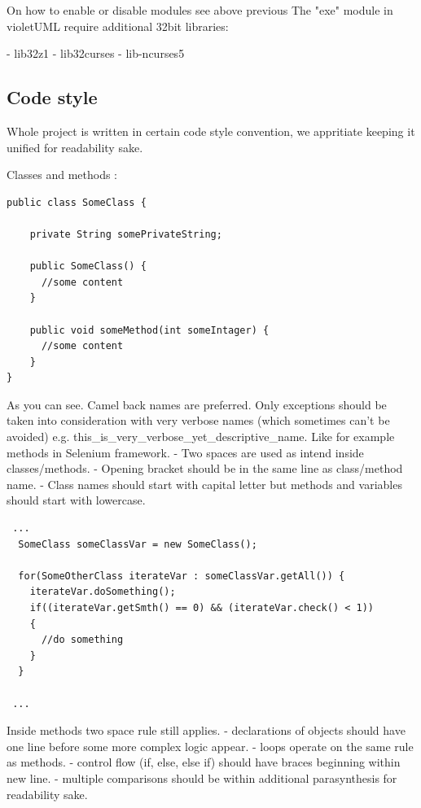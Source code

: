 \documentclass{article}
\begin{document}
On how to enable or disable modules see above previous
The "exe" module in violetUML require additional 32bit libraries:

- lib32z1\newline
- lib32curses\newline
- lib-ncurses5\newline


\subsection{Code style}

Whole project is written in certain code style convention, we appritiate keeping it unified for readability sake.

Classes and methods :
\begin{lstlisting}
public class SomeClass {

    private String somePrivateString;

    public SomeClass() {
      //some content
    }

    public void someMethod(int someIntager) {
      //some content
    }
}
\end{lstlisting}

As you can see. Camel back names are preferred. Only exceptions should be taken into consideration with very verbose names (which sometimes
can't be avoided) e.g. this\_is\_very\_verbose\_yet\_descriptive\_name. Like for example methods in Selenium framework.\newline
- Two spaces are used as intend inside classes/methods.\newline
- Opening bracket should be in the same line as class/method name.\newline
- Class names should start with capital letter but methods and variables should start with lowercase.\newline

\begin{lstlisting}
 ...
  SomeClass someClassVar = new SomeClass();
  
  for(SomeOtherClass iterateVar : someClassVar.getAll()) {
    iterateVar.doSomething();
    if((iterateVar.getSmth() == 0) && (iterateVar.check() < 1))
    {
      //do something
    }
  }
  
 ...
\end{lstlisting}

Inside methods two space rule still applies.\newline
- declarations of objects should have one line before some more complex logic appear.\newline
- loops operate on the same rule as methods.\newline
- control flow (if, else, else if) should have braces beginning within new line.\newline
- multiple comparisons should be within additional parasynthesis for readability sake.\newline
\end{document}
